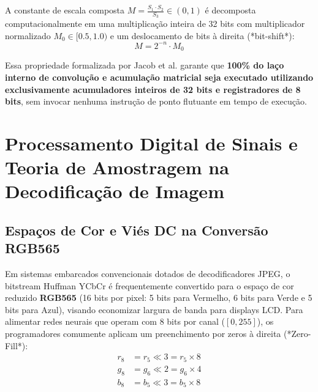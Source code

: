 A constante de escala composta $M = \frac{S_1 \cdot S_2}{S_3} \in (0, 1)$ é decomposta computacionalmente em uma multiplicação inteira de 32 bits com multiplicador normalizado $M_0 \in [0.5, 1.0)$ e um deslocamento de bits à direita (*bit-shift*):
\begin{equation}
M = 2^{-n} \cdot M_0
\end{equation}

Essa propriedade formalizada por Jacob et al. \cite{jacob2018quantization} garante que \textbf{100\% do laço interno de convolução e acumulação matricial seja executado utilizando exclusivamente acumuladores inteiros de 32 bits e registradores de 8 bits}, sem invocar nenhuma instrução de ponto flutuante em tempo de execução.

\section{Processamento Digital de Sinais e Teoria de Amostragem na Decodificação de Imagem}

\subsection{Espaços de Cor e Viés DC na Conversão RGB565}

Em sistemas embarcados convencionais dotados de decodificadores JPEG, o bitstream Huffman YCbCr é frequentemente convertido para o espaço de cor reduzido \textbf{RGB565} (16 bits por pixel: 5 bits para Vermelho, 6 bits para Verde e 5 bits para Azul), visando economizar largura de banda para displays LCD. Para alimentar redes neurais que operam com 8 bits por canal ($[0, 255]$), os programadores comumente aplicam um preenchimento por zeros à direita (*Zero-Fill*):
\begin{align}
r_8 &= r_5 \ll 3 = r_5 \times 8 \label{eq:zerofill_r} \\
g_8 &= g_6 \ll 2 = g_6 \times 4 \label{eq:zerofill_g} \\
b_8 &= b_5 \ll 3 = b_5 \times 8 \label{eq:zerofill_b}
\end{align}

